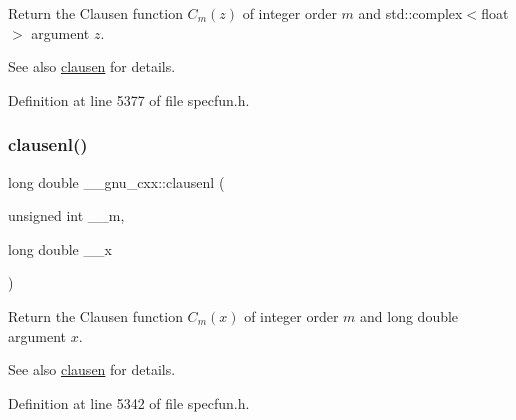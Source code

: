 Return the Clausen function $ C_m(z) $ of integer order $ m $ and {\ttfamily std\+::complex$<$float$>$} argument $ z $.

\begin{DoxySeeAlso}{See also}
\hyperlink{group__gnu__math__spec__func_ga54e4ba71b1f81718d6998349f91ff88f}{clausen} for details. 
\end{DoxySeeAlso}


Definition at line 5377 of file specfun.\+h.

\mbox{\label{group__gnu__math__spec__func_ga33132bab39c8d78dde807b45fc06de52}} 
\subsubsection{\texorpdfstring{clausenl()}{clausenl()}\hspace{0.1cm}{\footnotesize\ttfamily [1/2]}}
{\footnotesize\ttfamily long double \+\_\+\+\_\+gnu\+\_\+cxx\+::clausenl (\begin{DoxyParamCaption}\item[{unsigned int}]{\+\_\+\+\_\+m,  }\item[{long double}]{\+\_\+\+\_\+x }\end{DoxyParamCaption})\hspace{0.3cm}{\ttfamily [inline]}}

Return the Clausen function $ C_m(x) $ of integer order $ m $ and {\ttfamily long double} argument $ x $.

\begin{DoxySeeAlso}{See also}
\hyperlink{group__gnu__math__spec__func_ga54e4ba71b1f81718d6998349f91ff88f}{clausen} for details. 
\end{DoxySeeAlso}


Definition at line 5342 of file specfun.\+h.

\mbox{\label{group__gnu__math__spec__func_gae39368808280f5c1b80dce7c2f4a67a7}} 
